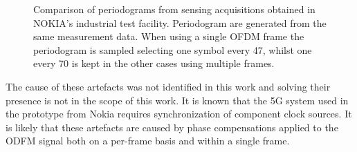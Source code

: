 \begin{figure}[H]
{	}\hfill
	\caption[]{\small Comparison of periodograms from sensing acquisitions obtained in NOKIA's industrial test facility.
		Periodogram are generated from the same measurement data. When using a single OFDM frame the periodogram is sampled selecting one symbol every 47, whilst one every 70 is kept in the other cases using multiple frames.  }
	\label{fig:TDD_artefacts}
\end{figure}

The cause of these artefacts was not identified in this work and solving their presence is not in the scope of this work. It is known that the 5G system used in the prototype from Nokia requires synchronization of component clock sources.
It is likely that these artefacts are caused by phase compensations applied to the ODFM signal both on a per-frame basis and within a single frame.